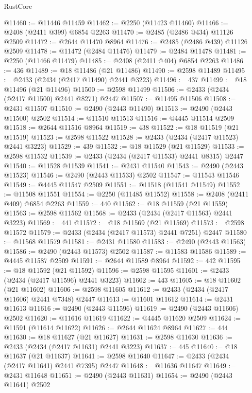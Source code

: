 \begin{lexlean}{RustCore}
\begin{coremodule}
@11460 := @11446 @11459
@11462 := @2250 (@11423 @11460)
@11466 := @2408 (@2411 @399) @6854 @2263
@11470 := @2485 (@2486 @434) @11126 @2509
@11472 := @2644 @11470 @8964
@11476 := @2485 (@2486 @439) @11126 @2509
@11478 := @11472 (@2484 @11476)
@11479 := @2484 @11478
@11481 := @2250 (@11466 @11479)
@11485 := @2408 (@2411 @404) @6854 @2263
@11486 := 436
@11489 := @18 @11486 (@21 @11486)
@11490 := @2598 @11489
@11495 := @2433 (@2434 (@2417 @11490) @2441 @3223)
@11496 := 437
@11499 := @18 @11496 (@21 @11496)
@11500 := @2598 @11499
@11506 := @2433 (@2434 (@2417 @11500) @2441 @8271) @2447
@11507 := @11495 @11506
@11508 := @2431 @11507
@11510 := @2490 (@2443 @11490)
@11513 := @2490 (@2443 @11500) @2502
@11514 := @11510 @11513
@11516 := @4445 @11514 @2509
@11518 := @2644 @11516 @8964
@11519 := 438
@11522 := @18 @11519 (@21 @11519)
@11523 := @2598 @11522
@11528 := @2433 (@2434 (@2417 @11523) @2441 @3223)
@11529 := 439
@11532 := @18 @11529 (@21 @11529)
@11533 := @2598 @11532
@11539 := @2433 (@2434 (@2417 @11533) @2441 @8315) @2447
@11540 := @11528 @11539
@11541 := @2431 @11540
@11543 := @2490 (@2443 @11523)
@11546 := @2490 (@2443 @11533) @2502
@11547 := @11543 @11546
@11549 := @4445 @11547 @2509
@11551 := @11518 (@11541 @11549)
@11552 := @11508 @11551
@11554 := @2250 (@11485 @11552)
@11558 := @2408 (@2411 @409) @6854 @2263
@11559 := 440
@11562 := @18 @11559 (@21 @11559)
@11563 := @2598 @11562
@11568 := @2433 (@2434 (@2417 @11563) @2441 @3223)
@11569 := 441
@11572 := @18 @11569 (@21 @11569)
@11573 := @2598 @11572
@11579 := @2433 (@2434 (@2417 @11573) @2441 @7251) @2447
@11580 := @11568 @11579
@11581 := @2431 @11580
@11583 := @2490 (@2443 @11563)
@11586 := @2490 (@2443 @11573) @2502
@11587 := @11583 @11586
@11589 := @4445 @11587 @2509
@11591 := @2644 @11589 @8964
@11592 := 442
@11595 := @18 @11592 (@21 @11592)
@11596 := @2598 @11595
@11601 := @2433 (@2434 (@2417 @11596) @2441 @3223)
@11602 := 443
@11605 := @18 @11602 (@21 @11602)
@11606 := @2598 @11605
@11612 := @2433 (@2434 (@2417 @11606) @2441 @7348) @2447
@11613 := @11601 @11612
@11614 := @2431 @11613
@11616 := @2490 (@2443 @11596)
@11619 := @2490 (@2443 @11606) @2502
@11620 := @11616 @11619
@11622 := @4445 @11620 @2509
@11624 := @11591 (@11614 @11622)
@11626 := @2644 @11624 @8964
@11627 := 444
@11630 := @18 @11627 (@21 @11627)
@11631 := @2598 @11630
@11636 := @2433 (@2434 (@2417 @11631) @2441 @3223)
@11637 := 445
@11640 := @18 @11637 (@21 @11637)
@11641 := @2598 @11640
@11647 := @2433 (@2434 (@2417 @11641) @2441 @7395) @2447
@11648 := @11636 @11647
@11649 := @2431 @11648
@11651 := @2490 (@2443 @11631)
@11654 := @2490 (@2443 @11641) @2502

\end{coremodule}
\end{lexlean}

